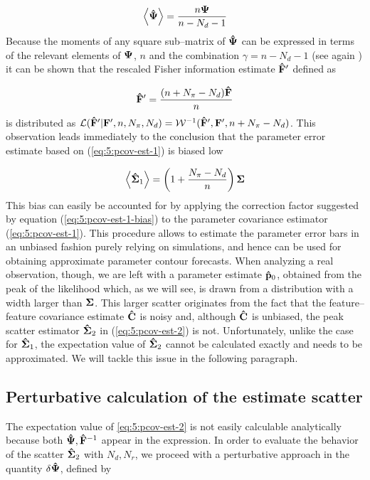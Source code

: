 \begin{equation}
\label{eq:5:inv-bias}
\left\langle\mathbf{\hat{\Psi}}\right\rangle = \frac{n\mathbf{\Psi}}{n-N_d-1}
\end{equation} 
%
Because the moments of any square sub--matrix of $\mathbf{\hat{\Psi}}$ can be expressed in terms of the relevant elements of $\mathbf{\Psi}$, $n$ and the combination $\gamma=n-N_d-1$ (see again \citep{MasumotoWishart}) it can be shown that the rescaled Fisher information estimate $\mathbf{\hat{F}}'$ defined as 

\begin{equation}
\label{eq:5:rescaledF}
\mathbf{\hat{F}}' = \frac{(n+N_\pi-N_d)\mathbf{\hat{F}}}{n}
\end{equation}
%
is distributed as $\mathcal{L}(\mathbf{\hat{F}}'\vert\mathbf{F}',n,N_\pi,N_d) = \mathcal{W}^{-1}(\mathbf{\hat{F}}',\mathbf{F}',n+N_\pi-N_d)$. This observation leads immediately to the conclusion that the parameter error estimate based on (\ref{eq:5:pcov-est-1}) is biased low

\begin{equation}
\label{eq:5:pcov-est-1-bias}
\left\langle\mathbf{\hat{\Sigma}}_1\right\rangle = \left(1+\frac{N_\pi-N_d}{n}\right)\mathbf{\Sigma}
\end{equation}
%
This bias can easily be accounted for by applying the correction factor suggested by equation (\ref{eq:5:pcov-est-1-bias}) to the parameter covariance estimator (\ref{eq:5:pcov-est-1}). This procedure allows to estimate the parameter error bars in an unbiased fashion purely relying on simulations, and hence can be used for obtaining approximate parameter contour forecasts. When analyzing a real observation, though, we are left with a parameter estimate $\mathbf{\hat{p}}_0$, obtained from the peak of the likelihood which, as we will see, is drawn from a distribution with a width larger than $\mathbf{\Sigma}$. This larger scatter originates from the fact that the feature--feature covariance estimate $\mathbf{\hat{C}}$ is noisy and, although $\mathbf{\hat{C}}$ is unbiased, the peak scatter estimator $\mathbf{\hat{\Sigma}}_2$ in (\ref{eq:5:pcov-est-2}) is not. Unfortunately, unlike the case for $\mathbf{\hat{\Sigma}}_1$, the expectation value of $\mathbf{\hat{\Sigma}}_2$ cannot be calculated exactly and needs to be approximated. We will tackle this issue in the following paragraph.  

\subsection{Perturbative calculation of the estimate scatter}
The expectation value of \ref{eq:5:pcov-est-2} is not easily calculable analytically because both $\mathbf{\hat{\Psi}},\mathbf{\hat{F}}^{-1}$ appear in the expression. In order to evaluate the behavior of the scatter $\mathbf{\hat{\Sigma}}_2$ with $N_d,N_r$, we proceed with a perturbative approach in the quantity $\delta\mathbf{\hat{\Psi}}$, defined by

